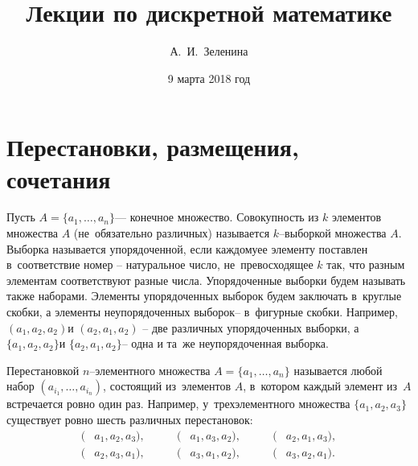 \documentclass[12pt]{article}
\date{9 марта 2018 год}
\author{А.\ И.\ Зеленина}
\title{\bf Лекции по дискретной математике }
\begin{document}
\maketitle
\newpage
\tableofcontents
\newpage
\section{  Перестановки, размещения, сочетания}
Пусть $A= \{a_1,\ldots,a_n\}$--- конечное множество. Совокупность из $k$ элементов множества $A$ (не~обязательно различных) называется $k$--выборкой множества $ A$. Выборка называется упорядоченной, если каждомуее элементу
поставлен в~соответствие номер -- натуральное число, не~превосходящее $k$
так, что разным элементам соответствуют разные числа. Упорядоченные
выборки будем называть также наборами. Элементы упорядоченных выборок будем заключать в~круглые скобки, а элементы неупорядоченных
выборок-- в~фигурные скобки. Например, $(a_1, a_2, a_2) $и $(a_2, a_1, a_2)$ -- две различных упорядоченных выборки, а $\{a_1, a_2, a_2\}$и $\{a_2, a_1, a_2\}$-- одна и та~же неупорядоченная выборка.

Перестановкой $n$--элементного множества $A = \{a_1,\ldots , a_n\}$ называется
любой набор $(a_{i_1},\ldots, a_{i_n})$, состоящий из~элементов $A$, в~котором каждый элемент из~$A$ встречается ровно один раз. Например, у~трехэлементного
множества $\{a_1, a_2, a_3\}$ существует ровно шесть различных перестановок:
\begin{align*}
    (&a_1 ,a_2,a_3), &\qquad (&a_1 ,a_3,a_2), &\qquad (&a_2 ,a_1,a_3),\\
    (&a_2 ,a_3,a_1), &\qquad (&a_3 ,a_1,a_2), &\qquad (&a_3,a_2,a_1).
\end{align*}
\end{document}
